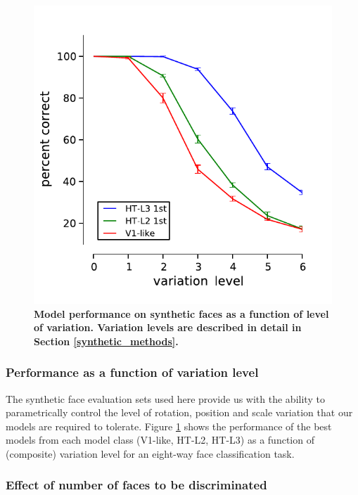 \begin{figure}[ht]
    \centering
    \includegraphics[scale=0.8]{figures/eight_faces_naturalbg_variation_v1like_a_plus.pdf}
    \caption[]{{\bf Model performance on synthetic faces as a function of level of variation.  Variation levels are described in detail in Section \ref{synthetic_methods}.}}
	\label{fig:perf_variation_levels}
\end{figure}

\subsubsection{Performance as a function of variation level}

The synthetic face evaluation sets used here provide us with the ability
to parametrically control the level of rotation, position and scale
variation that our models are required to tolerate.  Figure
\ref{fig:perf_variation_levels} shows the performance of the best models
from each model class (V1-like, HT-L2, HT-L3) as a function of
(composite) variation level for an eight-way face classification task.


\subsubsection{Effect of number of faces to be discriminated}

